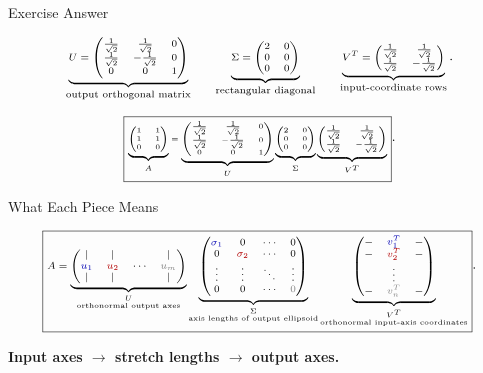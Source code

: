 \documentclass[10pt]{beamer}
\theoremstyle{definition}
\newcommand{\x}[1]{\alert{\textbf{#1}}}
\newcommand{\rd}[1]{{\color{red!70!black}#1}}
\newcommand{\bl}[1]{{\color{blue!70!black}#1}}
\newcommand{\gry}[1]{{\color{gray}#1}}
\newcommand{\Ucols}{\begin{pmatrix}|&|& &|\\ \bl{u_1}&\rd{u_2}&\cdots&\gry{u_m}\\ |&|& &|\end{pmatrix}}
\newcommand{\Vrows}{\begin{pmatrix}-&\bl{v_1^T}&-\\ -&\rd{v_2^T}&-\\ &\vdots&\\ -&\gry{v_n^T}&-\end{pmatrix}}
\newcommand{\Sigdisplay}{\begin{pmatrix}\bl{\sigma_1}&0&\cdots&0\\ 0&\rd{\sigma_2}&\cdots&0\\ \vdots&\vdots&\ddots&\vdots\\ 0&0&\cdots&\gry{0}\end{pmatrix}}
\begin{document}
\begin{frame}[shrink=18]{Exercise Answer}

\[
\scriptsize
\underbrace{
U=
\begin{pmatrix}
\frac1{\sqrt2}&\frac1{\sqrt2}&0\\[0.15em]
\frac1{\sqrt2}&-\frac1{\sqrt2}&0\\[0.15em]
0&0&1
\end{pmatrix}}_{\text{output orthogonal matrix}}
\qquad
\underbrace{
\Sigma=
\begin{pmatrix}
2&0\\
0&0\\
0&0
\end{pmatrix}}_{\text{rectangular diagonal}}
\qquad
\underbrace{
V^T=
\begin{pmatrix}
\frac1{\sqrt2}&\frac1{\sqrt2}\\[0.15em]
\frac1{\sqrt2}&-\frac1{\sqrt2}
\end{pmatrix}}_{\text{input-coordinate rows}}.
\]

\vfill

\[
\tiny
\boxed{
\underbrace{
\begin{pmatrix}
1&1\\
1&1\\
0&0
\end{pmatrix}}_{A}
=
\underbrace{
\begin{pmatrix}
\frac1{\sqrt2}&\frac1{\sqrt2}&0\\[0.15em]
\frac1{\sqrt2}&-\frac1{\sqrt2}&0\\[0.15em]
0&0&1
\end{pmatrix}}_{U}
\underbrace{
\begin{pmatrix}
2&0\\
0&0\\
0&0
\end{pmatrix}}_{\Sigma}
\underbrace{
\begin{pmatrix}
\frac1{\sqrt2}&\frac1{\sqrt2}\\[0.15em]
\frac1{\sqrt2}&-\frac1{\sqrt2}
\end{pmatrix}}_{V^T}
}.
\]

\end{frame}


\begin{frame}{What Each Piece Means}

\[
\scriptsize
\boxed{
A=
\underbrace{\Ucols}_{\substack{U\\\text{orthonormal output axes}}}
\underbrace{\Sigdisplay}_{\substack{\Sigma\\\text{axis lengths of output ellipsoid}}}
\underbrace{\Vrows}_{\substack{V^T\\\text{orthonormal input-axis coordinates}}}
}.
\]

\vfill

\begin{center}
\x{Input axes $\to$ stretch lengths $\to$ output axes.}
\end{center}

\end{frame}
\end{document}

